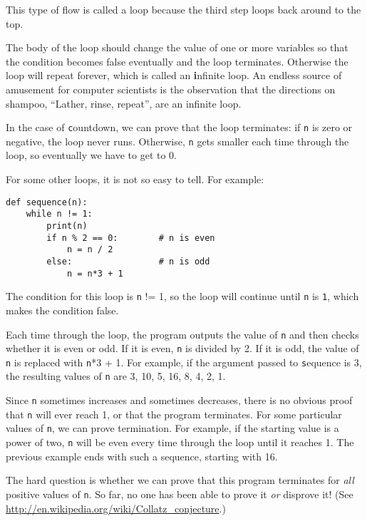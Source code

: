 \documentclass[
DIV=11,
fontsize=13,
twoside,
headinclude=false,
titlepage=firstiscover,
abstract=true,
headsepline=true,
footsepline=true,
chapterprefix=true, %
headings=big,
bibliography=totoc,%
captions=tableheading
]{scrbook}
\theoremstyle{definition}
\begin{document}
This type of flow is called a loop because the third step
loops back around to the top.  

The body of the loop should change the value of one or more variables
so that the condition becomes false eventually and the loop
terminates.  Otherwise the loop will repeat forever, which is called
an {\textbf infinite loop}.  An endless source of amusement for computer
scientists is the observation that the directions on shampoo,
``Lather, rinse, repeat'', are an infinite loop.

In the case of {\texttt countdown}, we can prove that the loop
terminates: if {\texttt n} is zero or negative, the loop never runs.
Otherwise, {\texttt n} gets smaller each time through the
loop, so eventually we have to get to 0.

For some other loops, it is not so easy to tell.  For example:

\begin{lstlisting}
def sequence(n):
    while n != 1:
        print(n)
        if n % 2 == 0:        # n is even
            n = n / 2
        else:                 # n is odd
            n = n*3 + 1
\end{lstlisting}
%
The condition for this loop is {\texttt n != 1}, so the loop will continue
until {\texttt n} is {\texttt 1}, which makes the condition false.

Each time through the loop, the program outputs the value of {\texttt n}
and then checks whether it is even or odd.  If it is even, {\texttt n} is
divided by 2.  If it is odd, the value of {\texttt n} is replaced with
{\texttt n*3 + 1}. For example, if the argument passed to {\texttt sequence}
is 3, the resulting values of {\texttt n} are 3, 10, 5, 16, 8, 4, 2, 1.

Since {\texttt n} sometimes increases and sometimes decreases, there is no
obvious proof that {\texttt n} will ever reach 1, or that the program
terminates.  For some particular values of {\texttt n}, we can prove
termination.  For example, if the starting value is a power of two,
{\texttt n} will be even every time through the loop
until it reaches 1. The previous example ends with such a sequence,
starting with 16.

The hard question is whether we can prove that this program terminates
for {\em all} positive values of {\texttt n}.  So far, no one has
been able to prove it {\em or} disprove it!  (See
  \url{http://en.wikipedia.org/wiki/Collatz_conjecture}.)
\end{document}
